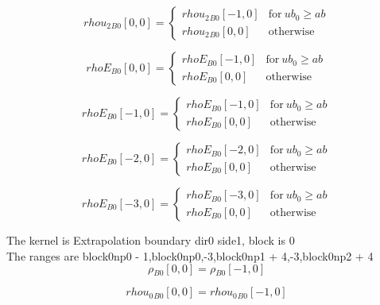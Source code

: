 \documentclass{article}
\begin{document}
\begin{dmath}{rhou_{2}{_{B0}}}[{0,0}] = \begin{cases} {rhou_{2}{_{B0}}}[{-1,0}] & \text{for}\: ub_{0} \geq ab \\{rhou_{2}{_{B0}}}[{0,0}] & \text{otherwise} \end{cases}\end{dmath}

\begin{dmath}{rhoE{_{B0}}}[{0,0}] = \begin{cases} {rhoE{_{B0}}}[{-1,0}] & \text{for}\: ub_{0} \geq ab \\{rhoE{_{B0}}}[{0,0}] & \text{otherwise} \end{cases}\end{dmath}

\begin{dmath}{rhoE{_{B0}}}[{-1,0}] = \begin{cases} {rhoE{_{B0}}}[{-1,0}] & \text{for}\: ub_{0} \geq ab \\{rhoE{_{B0}}}[{0,0}] & \text{otherwise} \end{cases}\end{dmath}

\begin{dmath}{rhoE{_{B0}}}[{-2,0}] = \begin{cases} {rhoE{_{B0}}}[{-2,0}] & \text{for}\: ub_{0} \geq ab \\{rhoE{_{B0}}}[{0,0}] & \text{otherwise} \end{cases}\end{dmath}

\begin{dmath}{rhoE{_{B0}}}[{-3,0}] = \begin{cases} {rhoE{_{B0}}}[{-3,0}] & \text{for}\: ub_{0} \geq ab \\{rhoE{_{B0}}}[{0,0}] & \text{otherwise} \end{cases}\end{dmath}

\noindent The kernel is Extrapolation boundary dir0 side1, block is 0\\\noindent The ranges are block0np0 - 1,block0np0,-3,block0np1 + 4,-3,block0np2 + 4\\\begin{dmath}{\rho{_{B0}}}[{0,0}] = {\rho{_{B0}}}[{-1,0}]\end{dmath}

\begin{dmath}{rhou_{0}{_{B0}}}[{0,0}] = {rhou_{0}{_{B0}}}[{-1,0}]\end{dmath}
\end{document}
